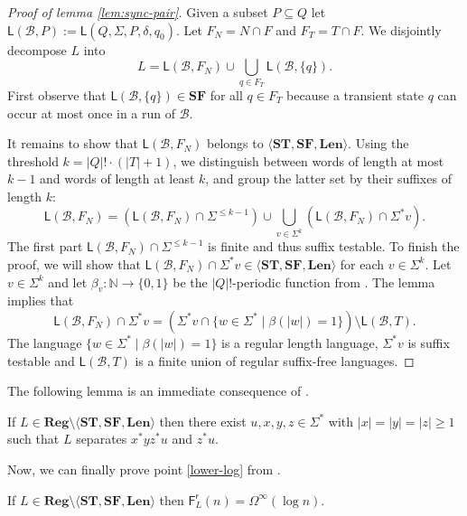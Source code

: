 \documentclass{theoretics}
\newcommand{\N}{\mathbb{N}}
\newcommand{\B}{\mathcal{B}}
\newcommand{\F}{\mathsf{F}}
\renewcommand{\L}{\mathsf{L}}
\renewcommand{\r}{\mathsf{r}}
\newcommand{\Reg}{\mathbf{Reg}}
\newcommand{\Len}{\mathbf{Len}}
\newcommand{\ST}{\mathbf{ST}}
\newcommand{\SF}{\mathbf{SF}}
\renewcommand{\geq}{\geqslant}
\renewcommand{\leq}{\leqslant}
\renewcommand{\ge}{\geq}
\renewcommand{\le}{\leq}
\newcommand{\Omegainf}{\Omega^{\scriptscriptstyle{\infty}}}
\begin{document}
\begin{proof}[Proof of lemma \ref{lem:sync-pair}]
Given a subset $P \subseteq Q$ let $\L(\B,P) := \L(Q,\Sigma,P,\delta,q_0)$.
Let $F_N = N \cap F$ and $F_T = T \cap F$.
We disjointly decompose $L$ into
\[
	L = \L(\B, F_N) \cup \bigcup_{q \in F_T} \L(\B, \{q\}).
\]
First observe that $\L(\B, \{q\}) \in \SF$ for all $q \in F_T$
because a transient state $q$ can occur at most once in a run of $\B$.

It remains to show  that  $\L(\B, F_N)$ belongs to $\langle \ST,\SF,\Len \rangle$.
Using the threshold $k=|Q|! \cdot (|T|+1)$,
we distinguish between words of length at most $k-1$ and words of length at least $k$,
and group the latter set by their suffixes of length $k$:
\[
	\L(\B, F_N) = (\L(\B, F_N) \cap \Sigma^{\le k-1})\cup\bigcup_{v\in\Sigma^{k}}(\L(\B, F_N) \cap \Sigma^* v).
\]
The first part $\L(\B, F_N) \cap \Sigma^{\le k-1}$ is finite and thus suffix testable.
To finish the proof, we will show that $\L(\B, F_N) \cap \Sigma^*v \in \langle \ST, \SF, \Len \rangle$
for each $v \in \Sigma^k$.
Let $v \in \Sigma^k$ and let $\beta_v \colon \N \to \{0,1\}$ be the $|Q|!$-periodic function from .
The lemma implies that
\[
	\L(\B, F_N) \cap \Sigma^*v = (\Sigma^*v \cap \{ w \in \Sigma^* \mid \beta(|w|) = 1 \}) \setminus \L(\B, T).
\]
The language $\{ w \in \Sigma^* \mid \beta(|w|) = 1 \}$ is 
a regular length language, $\Sigma^* v$ is suffix testable and $\L(\B, T)$ is a finite union of
regular suffix-free languages.
\end{proof}

The following lemma is an immediate consequence of .

\begin{lemma}\label{lemma:logprop}
If $L \in \Reg \setminus \langle \ST, \SF, \Len \rangle$
then there exist $u,x,y,z\in\Sigma^*$ with $|x|=|y|=|z| \ge 1$ such that
$L$ separates $x^*yz^*u$ and $z^*u$.
\end{lemma}
Now, we can finally prove point \ref{lower-log} from .

\begin{proposition}\label{lowerlognrandom}
If $L \in \Reg \setminus \langle \ST, \SF, \Len \rangle$
then $\F^\r_L(n) = \Omegainf(\log n)$.
\end{proposition}
\end{document}

